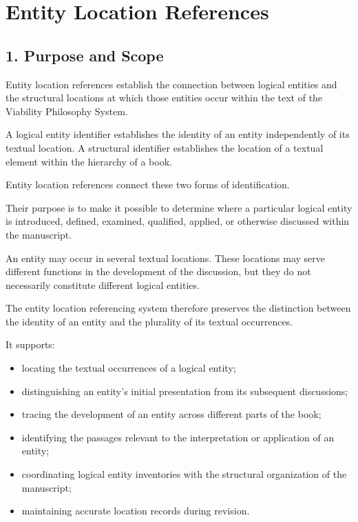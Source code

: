 
\cleardoublepage

\section*{Entity Location References}

{}


\subsection*{1. Purpose and Scope}

Entity location references establish the connection
between logical entities and the structural locations
at which those entities occur within the text of the
Viability Philosophy System.

A logical entity identifier establishes the identity
of an entity independently of its textual location.
A structural identifier establishes the location of
a textual element within the hierarchy of a book.

Entity location references connect these two forms
of identification.

Their purpose is to make it possible to determine
where a particular logical entity is introduced,
defined, examined, qualified, applied, or otherwise
discussed within the manuscript.

An entity may occur in several textual locations.
These locations may serve different functions in
the development of the discussion, but they do not
necessarily constitute different logical entities.

The entity location referencing system therefore
preserves the distinction between the identity of
an entity and the plurality of its textual occurrences.

It supports:

\begin{itemize}
    \item locating the textual occurrences of a
    logical entity;
    \item distinguishing an entity's initial
    presentation from its subsequent discussions;
    \item tracing the development of an entity
    across different parts of the book;
    \item identifying the passages relevant to
    the interpretation or application of an entity;
    \item coordinating logical entity inventories
    with the structural organization of the manuscript;
    \item maintaining accurate location records
    during revision.
\end{itemize}


